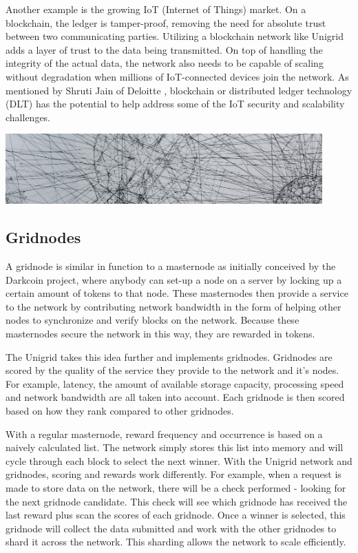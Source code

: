 \documentclass{article}
\begin{document}
Another example is the growing IoT (Internet of Things) market. On a blockchain, the ledger is tamper-proof, removing the need for absolute trust between two communicating parties. Utilizing a blockchain network like Unigrid adds a layer of trust to the data being transmitted. On top of handling the integrity of the actual data, the network also needs to be capable of scaling without degradation when millions of IoT-connected devices join the network. As mentioned by Shruti Jain of Deloitte \cite{jain2021}, blockchain or distributed ledger technology (DLT) has the potential to help address some of the IoT security and scalability challenges.
\begin{mdframed}[style=textimage]
	\includegraphics[width=345pt]{communication} 
\end{mdframed}
\subsection{Gridnodes}
A gridnode is similar in function to a masternode as initially conceived by the Darkcoin project, where anybody can set-up a node on a server by locking up a certain amount of tokens to that node. These masternodes then provide a service to the network by contributing network bandwidth in the form of helping other nodes to synchronize and verify blocks on the network. Because these masternodes secure the network in this way, they are rewarded in tokens.

The Unigrid takes this idea further and implements gridnodes. Gridnodes are scored by the quality of the service they provide to the network and it's nodes. For example, latency, the amount of available storage capacity, processing speed and network bandwidth are all taken into account. Each gridnode is then scored based on how they rank compared to other gridnodes.

With a regular masternode, reward frequency and occurrence is based on a naively calculated list. The network simply stores this list into memory and will cycle through each block to select the next winner. With the Unigrid network and gridnodes, scoring and rewards work differently. For example, when a request is made to store data on the network, there will be a check performed - looking for the next gridnode candidate. This check will see which gridnode has received the last reward plus scan the scores of each gridnode. Once a winner is selected, this gridnode will collect the data submitted and work with the other gridnodes to shard it across the network. This sharding allows the network to scale efficiently.
\end{document}
